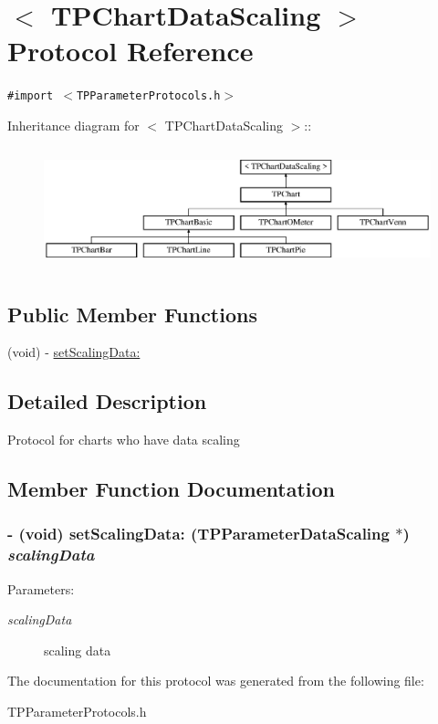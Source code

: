 \hypertarget{protocol_t_p_chart_data_scaling-p}{
\section{$<$ TPChartDataScaling $>$ Protocol Reference}
\label{protocol_t_p_chart_data_scaling-p}
}
{\tt \#import $<$TPParameterProtocols.h$>$}

Inheritance diagram for $<$ TPChartDataScaling $>$::\begin{figure}[H]
\begin{center}
\leavevmode
\includegraphics[height=3.5443cm]{protocol_t_p_chart_data_scaling-p}
\end{center}
\end{figure}
\subsection*{Public Member Functions}
\begin{CompactItemize}
\item 
(void) - \hyperlink{protocol_t_p_chart_data_scaling-p_940844c4e44e6f253f1b9b389646793d}{setScalingData:}
\end{CompactItemize}


\subsection{Detailed Description}
Protocol for charts who have data scaling 

\subsection{Member Function Documentation}
\hypertarget{protocol_t_p_chart_data_scaling-p_940844c4e44e6f253f1b9b389646793d}{
\subsubsection[{setScalingData:}]{\setlength{\rightskip}{0pt plus 5cm}- (void) setScalingData: ({\bf TPParameterDataScaling} $\ast$) {\em scalingData}}}
\label{protocol_t_p_chart_data_scaling-p_940844c4e44e6f253f1b9b389646793d}


\begin{Desc}
\item[Parameters:]
\begin{description}
\item[{\em scalingData}]scaling data \end{description}
\end{Desc}


The documentation for this protocol was generated from the following file:\begin{CompactItemize}
\item 
TPParameterProtocols.h\end{CompactItemize}
